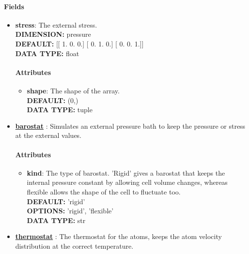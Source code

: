 \paragraph{Fields}
 \begin{itemize}
\item {\bf stress}:
 The external stress.
{\\ \bf DIMENSION: }pressure
{\\ \bf DEFAULT: }
      [[ 1.  0.  0.]
       [ 0.  1.  0.]
       [ 0.  0.  1.]]
{\\ \bf DATA TYPE: }float
\paragraph{Attributes}
 \begin{itemize}
\item {\bf shape}:
 The shape of the array.
{\\ \bf DEFAULT: }(0,)
{\\ \bf DATA TYPE: }tuple
\end{itemize}
 
\item {\bf \hyperref[BAROSTAT]{barostat} }:
 Simulates an external pressure bath to keep the pressure or stress at the external values.
\paragraph{Attributes}
 \begin{itemize}
\item {\bf kind}:
 The type of barostat. 'Rigid' gives a barostat that keeps the internal pressure constant by allowing cell volume changes, whereas flexible allows the shape of the cell to fluctuate too.
{\\ \bf DEFAULT: }'rigid'
{\\ \bf OPTIONS: }'rigid', 'flexible'
{\\ \bf DATA TYPE: }str
\end{itemize}
 
\item {\bf \hyperref[THERMOSTATS]{thermostat} }:
 The thermostat for the atoms, keeps the atom velocity distribution at the correct temperature.

\end{itemize}
